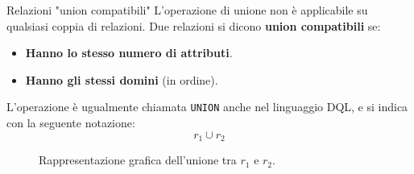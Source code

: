 \documentclass[12pt]{report}
\begin{document}
	\begin{definizione}{Relazioni "union compatibili"}{}
		L'operazione di unione non è applicabile su qualsiasi coppia di relazioni. Due relazioni si dicono \textbf{union compatibili} se:
		\begin{itemize}
			\item \textbf{Hanno lo stesso numero di attributi}.
			
			\item \textbf{Hanno gli stessi domini} (in ordine).
		\end{itemize}
	\end{definizione}
	
	L'operazione è ugualmente chiamata \texttt{UNION} anche nel linguaggio DQL, e si indica con la seguente notazione:
	\[
		r_1 \cup r_2
	\]
	\begin{figure}[htbp]
		\centering
		\usetikzlibrary{patterns}
		\caption{Rappresentazione grafica dell'unione tra $r_1$ e $r_2$.}
		\label{fig:unione_relazioni}
	\end{figure}
	
\end{document}
